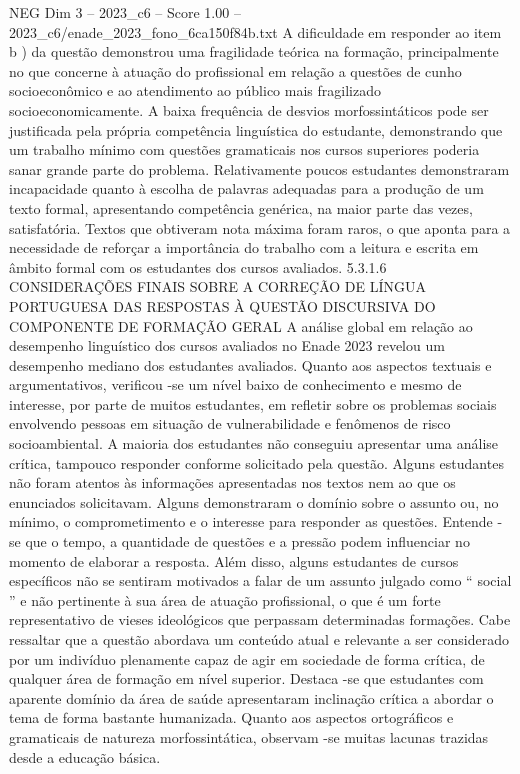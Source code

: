 \begin{textsample}{NEG Dim 3 – 2023\_c6 – Score 1.00 – 2023\_c6/enade\_2023\_fono\_6ca150f84b.txt}
A dificuldade em responder ao item b ) da questão demonstrou uma fragilidade teórica na formação, principalmente no que concerne à atuação do profissional em relação a questões de cunho socioeconômico e ao atendimento ao público mais fragilizado socioeconomicamente.
A baixa frequência de desvios morfossintáticos pode ser justificada pela própria competência linguística do estudante, demonstrando que um trabalho mínimo com questões gramaticais nos cursos superiores poderia sanar grande parte do problema.
Relativamente poucos estudantes demonstraram incapacidade quanto à escolha de palavras adequadas para a produção de um texto formal, apresentando competência genérica, na maior parte das vezes, satisfatória.
Textos que obtiveram nota máxima foram raros, o que aponta para a necessidade de reforçar a importância do trabalho com a leitura e escrita em âmbito formal com os estudantes dos cursos avaliados. 5.3.1.6 CONSIDERAÇÕES FINAIS SOBRE A CORREÇÃO DE LÍNGUA PORTUGUESA DAS RESPOSTAS À QUESTÃO DISCURSIVA DO COMPONENTE DE FORMAÇÃO GERAL A análise global em relação ao desempenho linguístico dos cursos avaliados no Enade 2023 revelou um desempenho mediano dos estudantes avaliados.
Quanto aos aspectos textuais e argumentativos, verificou -se um nível baixo de conhecimento e mesmo de interesse, por parte de muitos estudantes, em refletir sobre os problemas sociais envolvendo pessoas em situação de vulnerabilidade e fenômenos de risco socioambiental.
A maioria dos estudantes não conseguiu apresentar uma análise crítica, tampouco responder conforme solicitado pela questão.
Alguns estudantes não foram atentos às informações apresentadas nos textos nem ao que os enunciados solicitavam.
Alguns demonstraram o domínio sobre o assunto ou, no mínimo, o comprometimento e o interesse para responder as questões.
Entende -se que o tempo, a quantidade de questões e a pressão podem influenciar no momento de elaborar a resposta.
Além disso, alguns estudantes de cursos específicos não se sentiram motivados a falar de um assunto julgado como “ social ” e não pertinente à sua área de atuação profissional, o que é um forte representativo de vieses ideológicos que perpassam determinadas formações.
Cabe ressaltar que a questão abordava um conteúdo atual e relevante a ser considerado por um indivíduo plenamente capaz de agir em sociedade de forma crítica, de qualquer área de formação em nível superior.
Destaca -se que estudantes com aparente domínio da área de saúde apresentaram inclinação crítica a abordar o tema de forma bastante humanizada.
Quanto aos aspectos ortográficos e gramaticais de natureza morfossintática, observam -se muitas lacunas trazidas desde a educação básica.

\end{textsample}
